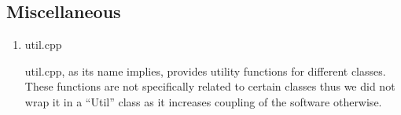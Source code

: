\documentclass[12pt, a4paper]{article}
\begin{document}
\subsection{Miscellaneous}
\begin{enumerate}
\item util.cpp

util.cpp, as its name implies, provides utility functions for different classes.
These functions are not specifically related to certain classes thus we did not wrap it in a ``Util'' class as it increases
coupling of the software otherwise.


\end{enumerate}


\newpage
\end{document}
